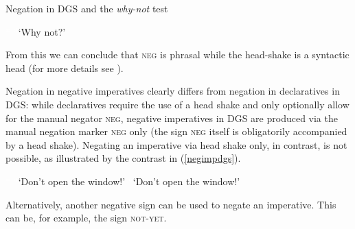 \begin{digression}{Negation in DGS and the \textit{why-not} test}{}
\begin{exe}
\begin{xlist}
\ex\label{ex:modaldoublingnegb} \textcolor{white}{*}
\glt \textcolor{white}{*}`Why not?'
\end{xlist}
\end{exe}


\noindent From this we can conclude that \textsc{neg} is phrasal while the head-shake is a syntactic head (for more details see \citealt{pfau2016featural}).

 

\end{digression}

\noindent Negation in negative imperatives clearly differs from negation in declaratives in DGS: while declaratives require the use of a head shake and only optionally allow for the manual negator \textsc{neg}, negative imperatives in DGS are produced via the manual negation marker \textsc{neg} only (the sign \textsc{neg} itself is obligatorily accompanied by a head shake). Negating an imperative via head shake only, in contrast, is not possible, as illustrated by the contrast in (\ref{negimpdgs}).   

\begin{exe}
\ex\label{negimpdgs}\begin{xlist} 
\ex\label{negimpdgsa} \textcolor{white}{*}
\glt \textcolor{white}{*}`Don't open the window!'
\ex *
\glt \textcolor{white}{*}`Don't open the window!'
\end{xlist}
\end{exe} 

\noindent Alternatively, another negative sign can be used to negate an imperative. This can be, for example, the sign \textsc{not-yet}. %

